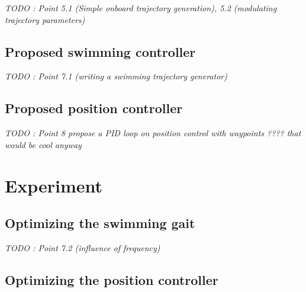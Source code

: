 \documentclass[11pt]{article}
\begin{document}
\textit{TODO : Point 5.1 (Simple onboard trajectory generation), 5.2 (modulating trajectory parameters)}

\subsection{Proposed swimming controller}

\textit{TODO : Point 7.1 (writing a swimming trajectory generator)}

\subsection{Proposed position controller}

\textit{TODO : Point 8 propose a PID loop on position control with waypoints ???? that would be cool anyway}

\section{Experiment}

\subsection{Optimizing the swimming gait}

\textit{TODO : Point 7.2 (influence of frequency)}

\subsection{Optimizing the position controller}

\printbibliography %
\end{document}
